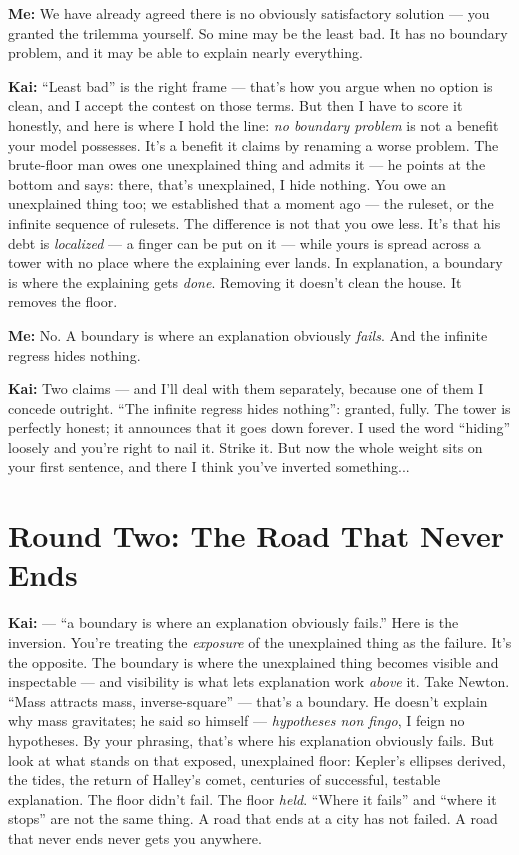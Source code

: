 \documentclass[fontsize=11pt,paper=a4,pagesize=auto,parskip=half-]{scrbook}
\newcommand\En{\centerline{\textemdash \qquad \ding{166} \qquad \textemdash}}
\newcommand{\speaker}[1]{\par\noindent\textbf{#1:}\hspace{0.6em}}
\begin{document}
\speaker{Me} We have already agreed there is no obviously satisfactory solution --- you granted the trilemma yourself. So mine may be the least bad. It has no boundary problem, and it may be able to explain nearly everything.

\speaker{Kai} ``Least bad'' is the right frame --- that's how you argue when no option is clean, and I accept the contest on those terms. But then I have to score it honestly, and here is where I hold the line: \emph{no boundary problem} is not a benefit your model possesses. It's a benefit it claims by renaming a worse problem. The brute-floor man owes one unexplained thing and admits it --- he points at the bottom and says: there, that's unexplained, I hide nothing. You owe an unexplained thing too; we established that a moment ago --- the ruleset, or the infinite sequence of rulesets. The difference is not that you owe less. It's that his debt is \emph{localized} --- a finger can be put on it --- while yours is spread across a tower with no place where the explaining ever lands. In explanation, a boundary is where the explaining gets \emph{done}. Removing it doesn't clean the house. It removes the floor.

\speaker{Me} No. A boundary is where an explanation obviously \emph{fails}. And the infinite regress hides nothing.

\speaker{Kai} Two claims --- and I'll deal with them separately, because one of them I concede outright. ``The infinite regress hides nothing'': granted, fully. The tower is perfectly honest; it announces that it goes down forever. I used the word ``hiding'' loosely and you're right to nail it. Strike it. But now the whole weight sits on your first sentence, and there I think you've inverted something...

\En

\section{Round Two: The Road That Never Ends}

\speaker{Kai} --- ``a boundary is where an explanation obviously fails.'' Here is the inversion. You're treating the \emph{exposure} of the unexplained thing as the failure. It's the opposite. The boundary is where the unexplained thing becomes visible and inspectable --- and visibility is what lets explanation work \emph{above} it. Take Newton. ``Mass attracts mass, inverse-square'' --- that's a boundary. He doesn't explain why mass gravitates; he said so himself --- \emph{hypotheses non fingo}, I feign no hypotheses. By your phrasing, that's where his explanation obviously fails. But look at what stands on that exposed, unexplained floor: Kepler's ellipses derived, the tides, the return of Halley's comet, centuries of successful, testable explanation. The floor didn't fail. The floor \emph{held}. ``Where it fails'' and ``where it stops'' are not the same thing. A road that ends at a city has not failed. A road that never ends never gets you anywhere.
\end{document}
